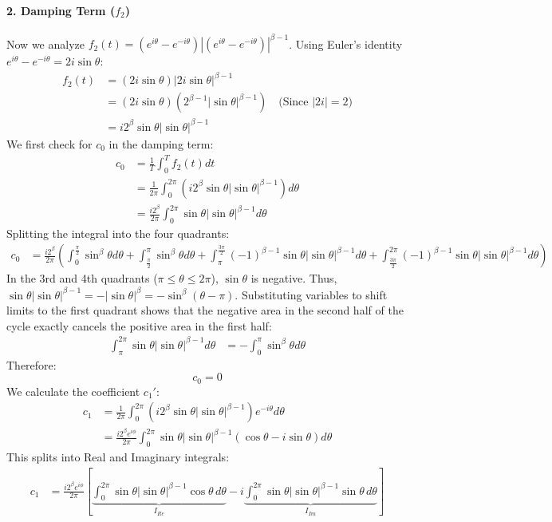 \documentclass[10pt,twoside]{report}
\begin{document}
\paragraph{2. Damping Term ($f_2$)}
Now we analyze $f_2(t) = (e^{i\theta} - e^{-i\theta}) \left| (e^{i\theta} - e^{-i\theta}) \right|^{\beta-1}$.
Using Euler's identity $e^{i\theta} - e^{-i\theta} = 2i\sin\theta$:
\begin{align*}
    f_2(t) &= (2i\sin\theta) \left| 2i\sin\theta \right|^{\beta-1} \\
           &= (2i\sin\theta) \left( 2^{\beta-1} |\sin\theta|^{\beta-1} \right) \quad \text{(Since } |2i|=2 \text{)} \\
           &= i 2^\beta \sin\theta |\sin\theta|^{\beta-1}
\end{align*}
We first check for $c_0$ in the damping term:
\begin{align*}
    c_0 &= \frac{1}{T} \int_{0}^{T} f_2(t) dt \\
        &= \frac{1}{2\pi} \int_{0}^{2\pi} \left( i 2^\beta \sin\theta |\sin\theta|^{\beta-1} \right) d\theta \\
        &= \frac{i 2^\beta}{2\pi} \int_{0}^{2\pi} \sin\theta |\sin\theta|^{\beta-1} d\theta
\end{align*}
Splitting the integral into the four quadrants:
\begin{align*}
    c_0 &= \frac{i 2^\beta}{2\pi} \left( \int_{0}^{\frac{\pi}{2}} \sin^\beta\theta d\theta + \int_{\frac{\pi}{2}}^{\pi} \sin^\beta\theta d\theta + \int_{\pi}^{\frac{3\pi}{2}} (-1)^{\beta-1} \sin\theta |\sin\theta|^{\beta-1} d\theta + \int_{\frac{3\pi}{2}}^{2\pi} (-1)^{\beta-1} \sin\theta |\sin\theta|^{\beta-1} d\theta \right)
\end{align*}
In the 3rd and 4th quadrants ($\pi \le \theta \le 2\pi$), $\sin\theta$ is negative. Thus, $\sin\theta |\sin\theta|^{\beta-1} = -|\sin\theta|^\beta = -\sin^\beta(\theta-\pi)$.
Substituting variables to shift limits to the first quadrant shows that the negative area in the second half of the cycle exactly cancels the positive area in the first half:
\begin{align*}
    \int_{\pi}^{2\pi} \sin\theta |\sin\theta|^{\beta-1} d\theta &= -\int_{0}^{\pi} \sin^\beta\theta d\theta
\end{align*}
Therefore:
\begin{equation}
    c_0 = 0
\end{equation}
We calculate the coefficient $c_1'$:
\begin{align*}
    c_1 &= \frac{1}{2\pi} \int_{0}^{2\pi} \left( i 2^\beta \sin\theta |\sin\theta|^{\beta-1} \right) e^{-i\theta} d\theta \\
         &= \frac{i 2^\beta e^{i\phi}}{2\pi} \int_{0}^{2\pi} \sin\theta |\sin\theta|^{\beta-1} (\cos\theta - i\sin\theta) d\theta
\end{align*}
This splits into Real and Imaginary integrals:
\begin{align*}
    c_1 &= \frac{i 2^\beta e^{i\phi}}{2\pi} \left[ \underbrace{\int_{0}^{2\pi} \sin\theta |\sin\theta|^{\beta-1} \cos\theta \, d\theta}_{I_{Re}} - i \underbrace{\int_{0}^{2\pi} \sin\theta |\sin\theta|^{\beta-1} \sin\theta \, d\theta}_{I_{Im}} \right]
\end{align*}
\end{document}

